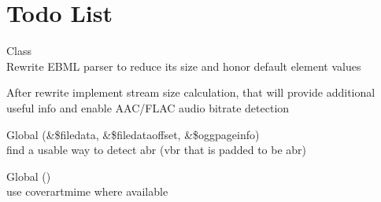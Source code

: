 \chapter{Todo List}
\hypertarget{todo}{}\label{todo}

\begin{DoxyRefList}
\item[Class \doxylink{classgetid3__matroska}{getid3\+\_\+matroska} ]\hfill \\
\label{todo__todo000001}%
%
Rewrite EBML parser to reduce it\textquotesingle{}s size and honor default element values 



After rewrite implement stream size calculation, that will provide additional useful info and enable AAC/\+FLAC audio bitrate detection  
\item[Global \doxylink{classgetid3__ogg_a502e047481322cdeced8508700f6c7b5}{getid3\+\_\+ogg\+::Parse\+Opus\+Page\+Header} (\&\$filedata, \&\$filedataoffset, \&\$oggpageinfo)]\hfill \\
\label{todo__todo000003}%
%
find a usable way to detect abr (vbr that is padded to be abr)  
\item[Global \doxylink{classgetid3__ogg_a7a8a53e97697976b72c04dcdcdc61b9c}{getid3\+\_\+ogg\+::Parse\+Vorbis\+Comments} ()]\hfill \\
\label{todo__todo000004}%
%
use \textquotesingle{}coverartmime\textquotesingle{} where available 
\end{DoxyRefList}